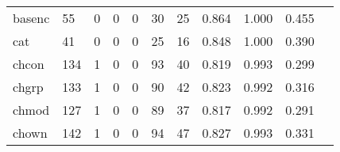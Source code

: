 \begin{longtable}{lp{1.2cm}p{1.2cm}p{1.2cm}p{1.2cm}p{1.2cm}p{1.2cm}p{1.2cm}p{1.2cm}p{1.2cm}p{1.2cm}}
basenc    &                                    55 &                                                  0 &                                                  0 &                                                  0 &                                                 30 &                                                 25 &                                              0.864 &                                              1.000 &                                              0.455 \\
cat       &                                    41 &                                                  0 &                                                  0 &                                                  0 &                                                 25 &                                                 16 &                                              0.848 &                                              1.000 &                                              0.390 \\
chcon     &                                   134 &                                                  1 &                                                  0 &                                                  0 &                                                 93 &                                                 40 &                                              0.819 &                                              0.993 &                                              0.299 \\
chgrp     &                                   133 &                                                  1 &                                                  0 &                                                  0 &                                                 90 &                                                 42 &                                              0.823 &                                              0.992 &                                              0.316 \\
chmod     &                                   127 &                                                  1 &                                                  0 &                                                  0 &                                                 89 &                                                 37 &                                              0.817 &                                              0.992 &                                              0.291 \\
chown     &                                   142 &                                                  1 &                                                  0 &                                                  0 &                                                 94 &                                                 47 &                                              0.827 &                                              0.993 &                                              0.331 \\

\end{longtable}
